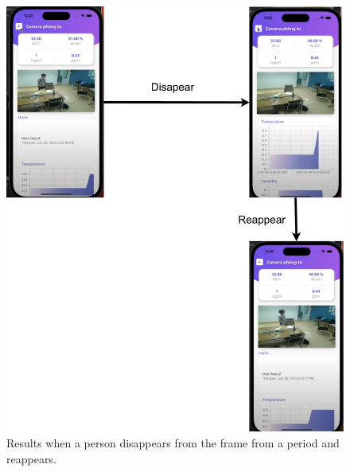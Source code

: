 \documentclass[../main.tex]{subfiles}
\begin{document}
\begin{figure}[h!]
\centering
\includegraphics[width=\linewidth]{Figure/func_disappear.pdf}
\caption{Results when a person disappears from the frame from a period and reappears.}
\label{fig:func_disappear}
\end{figure}
\end{document}
